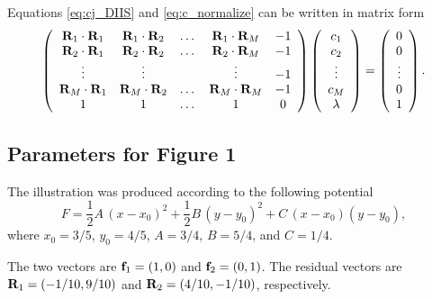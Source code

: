 \documentclass[aip,jcp,preprint,notitlepage, superscriptaddress]{revtex4-1}
\begin{document}
Equations \eqref{eq:cj_DIIS} and \eqref{eq:c_normalize}
can be written in matrix form
%
\begin{equation}
\left(
  \begin{array}{ccccc}
    \mathbf{R}_1 \cdot \mathbf{R}_1 &
    \mathbf{R}_1 \cdot \mathbf{R}_2 &
    \dots &
    \mathbf{R}_1 \cdot \mathbf{R}_M &
    -1 \\
    \mathbf{R}_2 \cdot \mathbf{R}_1 &
    \mathbf{R}_2 \cdot \mathbf{R}_2 &
    \dots &
    \mathbf{R}_2 \cdot \mathbf{R}_M &
    -1 \\
    \vdots &
    \vdots &
    &
    \vdots &
    -1 \\
    \mathbf{R}_M \cdot \mathbf{R}_1 &
    \mathbf{R}_M \cdot \mathbf{R}_2 &
    \dots &
    \mathbf{R}_M \cdot \mathbf{R}_M &
    -1 \\
    1 &
    1 &
    \dots &
    1 &
    0
  \end{array}
\right)
\left(
  \begin{array}{c}
    c_1 \\
    c_2 \\
    \vdots \\
    c_M \\
    \lambda
  \end{array}
\right)
=
\left(
  \begin{array}{c}
    0 \\
    0 \\
    \vdots \\
    0 \\
    1
  \end{array}
\right).
\end{equation}





\subsection{Parameters for Figure 1}



The illustration was produced according to the following potential
%
\begin{equation}
F
=
\frac{1}{2} A \, ( x - x_0 )^2
+
\frac{1}{2} B \, ( y - y_0 )^2
+
C \, ( x - x_0 ) ( y - y_0 ),
\label{eq:fig1_F}
\end{equation}
%
where
$x_0 = 3/5$,
$y_0 = 4/5$,
$A = 3/4$,
$B = 5/4$,
and
$C = 1/4$.



The two vectors are
$\mathbf{f}_1 = (1, 0)$
and
$\mathbf{f}_2 = (0, 1)$.
%
The residual vectors are
$\mathbf{R}_1 = (-1/10, 9/10)$
and
$\mathbf{R}_2 = (4/10, -1/10)$,
respectively.
\end{document}
